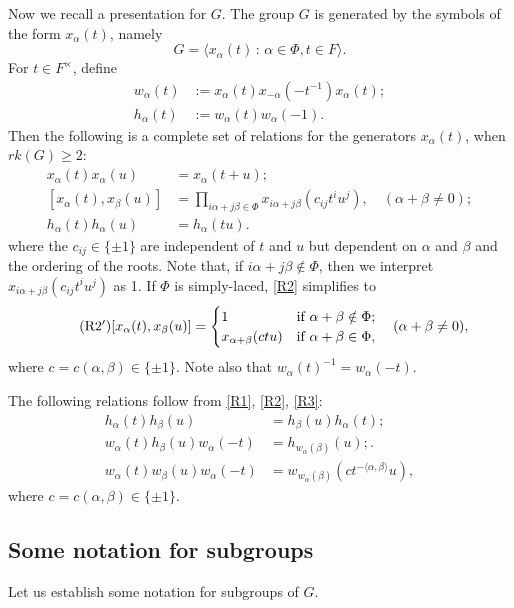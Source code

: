 \documentclass[10pt, letterpaper]{amsart}
\theoremstyle{plain}
\theoremstyle{definition}
\numberwithin{equation}{section}
\newcommand{\xa}{x_{\alpha}}
\newcommand{\wa}{w_{\alpha}}
\newcommand{\ha}{h_{\alpha}}
\newcommand{\xb}{x_{\beta}}
\newcommand{\wb}{w_{\beta}}
\newcommand{\hb}{h_{\beta}}
\newcommand{\la}{\langle}
\newcommand{\ra}{\rangle}
\newcommand{\st}{\,:\,}
\begin{document}
Now we recall a presentation for $G$. The group $G$ is generated by the symbols of the form $x_{\alpha}(t)$, namely
\[
G=\la \xa(t)\st \alpha\in\Phi, t\in F\ra.
\] 
For $t\in F^\times$, define
\begin{align*}
\wa(t)&:=\xa(t)x_{-\alpha}(-t^{-1})\xa(t);\\
\ha(t)&:=w_{\alpha}(t)\wa(-1).
\end{align*}
Then the following is a complete set of relations for the generators $\xa(t)$, when $rk(G)\geq 2$:
\begin{align}
\tag{R1}\xa(t)\xa(u)&=\xa(t+u);\label{R1}\\
\tag{R2}[\xa(t), \xb(u)]&=\prod_{i\alpha+j\beta\in\Phi}x_{i\alpha+j\beta}(c_{ij}t^iu^j),\quad(\alpha+\beta\neq 0);\label{R2}\\
\tag{R3}\ha(t)\ha(u)&=\ha(tu).\label{R3}
\end{align}
where the $c_{ij}\in \{\pm1\}$ are independent of $t$ and $u$ but dependent on $\alpha$ and $\beta$ and the ordering of the roots. Note that, if $i\alpha+j\beta\notin\Phi$, then we interpret $x_{i\alpha+j\beta}(c_{ij}t^iu^j)$ as 1. If $\Phi$ is simply-laced, \eqref{R2} simplifies to 
\begin{equation}
\tag{R2$^{\prime}$}[\xa(t), \xb(u)]=\begin{cases}1&\text{if $\alpha+\beta\notin\Phi$};\\
x_{\alpha+\beta}(ctu)&\text{if $\alpha+\beta\in\Phi$},
\end{cases}
\quad (\alpha+\beta\neq 0),
\end{equation}
where $c=c(\alpha, \beta)\in\{\pm 1\}$. Note also that $\wa(t)^{-1}=\wa(-t)$. 


The following relations follow from \eqref{R1}, \eqref{R2}, \eqref{R3}:
\begin{align*}
\tag{R4}\ha(t)\hb(u)&=\hb(u)\ha(t);\label{R4}\\
\tag{R5}\wa(t)\hb(u)\wa(-t)&=h_{w_\alpha(\beta)}(u);\label{R5}.\\
\tag{R6}\wa(t)\wb(u)\wa(-t)&=w_{w_\alpha(\beta)}(ct^{-\la\alpha, \beta\ra}u)\label{R6},
\end{align*}
where $c=c(\alpha, \beta)\in\{\pm 1\}$.


\subsection{Some notation for subgroups}
Let us establish some notation for subgroups of $G$.
\end{document}
